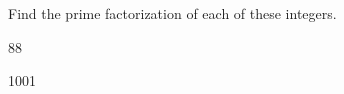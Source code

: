 
%
%
%

	Find the prime factorization of each of these integers.
	\begin{subproblem}
		\item 88
		\skipitem
		\skipitem
		\item 1001
	\end{subproblem}

\solution
	\begin{subproblem}
		\item 
		\skipitem
		\skipitem
		\item
	\end{subproblem}
